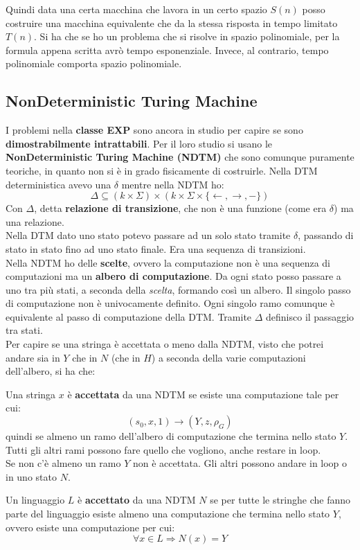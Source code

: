 Quindi data una certa macchina che lavora in un certo spazio $S(n)$ posso
costruire una macchina equivalente che da la stessa risposta in tempo limitato
$T(n)$. Si ha che se ho un problema che si risolve in spazio polinomiale, per
la formula appena scritta avrò tempo esponenziale. Invece, al contrario, tempo
polinomiale comporta spazio polinomiale.
\subsection{NonDeterministic Turing Machine}
I problemi nella \textbf{classe EXP} sono ancora in studio per capire se sono
\textbf{dimostrabilmente intrattabili}. Per il loro studio
si usano le \textbf{NonDeterministic Turing Machine (NDTM)} che sono comunque
puramente teoriche, in quanto non si è in grado fisicamente di costruirle. Nella
DTM deterministica avevo una $\delta$ mentre nella NDTM ho:
\[\Delta\subseteq (k\times \Sigma)\times (k\times \Sigma \times\{\leftarrow,
  \rightarrow, -\})\]
Con $\Delta$, detta \textbf{relazione di transizione}, che non è una funzione
(come era $\delta$) ma una relazione.\\ 
Nella DTM dato uno stato potevo passare ad un solo stato tramite $\delta$,
passando di stato in stato fino ad uno stato finale. Era una sequenza di
transizioni. \\
Nella NDTM ho delle \textbf{scelte}, ovvero la computazione non è una sequenza
di computazioni ma un \textbf{albero di computazione}. Da ogni stato posso
passare a uno tra più stati, a seconda della \textit{scelta}, formando così un
albero. Il singolo passo di computazione non è univocamente definito. Ogni
singolo ramo comunque è equivalente al passo di computazione della DTM. Tramite
$\Delta$ definisco il passaggio tra stati.\\
Per capire se una stringa è accettata o meno dalla NDTM, visto che potrei andare
sia in $Y$ che in $N$ (che in $H$) a seconda della varie computazioni
dell'albero, si ha che:
\begin{definizione}
  Una stringa $x$ è \textbf{accettata} da una NDTM se esiste una computazione
  tale per cui:
  \[(s_0,x,1)\to(Y, z, \rho_G)\]
  quindi se almeno un ramo dell'albero di computazione che termina nello stato
  $Y$. Tutti gli altri rami possono fare quello che vogliono, anche restare in
  loop.\\
  Se non c'è almeno un ramo $Y$ non è accettata. Gli altri possono andare in
  loop o in uno stato $N$.
\end{definizione}
\begin{definizione}
  Un linguaggio $L$ è \textbf{accettato} da una NDTM $N$ se per tutte le
  stringhe che fanno parte del linguaggio esiste almeno una computazione che
  termina nello stato $Y$, ovvero esiste una computazione per cui:
  \[\forall x\in L\Rightarrow N(x)=Y\]
\end{definizione}
